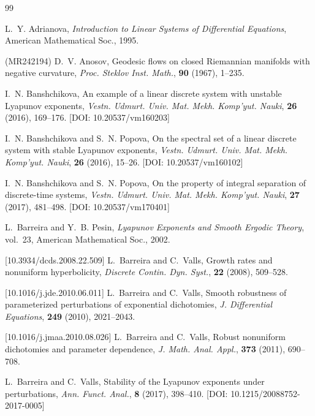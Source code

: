 \documentclass[11pt]{article}
\begin{document}
\begin{thebibliography}{99}

\newblock L.~Y. Adrianova,
\newblock \emph{Introduction to Linear Systems of Differential Equations},
\newblock American Mathematical Soc., 1995.

 (MR242194)
\newblock D.~V. Anosov,
\newblock Geodesic flows on closed {Riemannian} manifolds with negative
  curvature,
\newblock \emph{Proc. Steklov Inst. Math.}, \textbf{90} (1967), 1--235.
\fi

\newblock I.~N. Banshchikova,
\newblock An example of a linear discrete system with unstable {Lyapunov}
  exponents,
\newblock \emph{Vestn. Udmurt. Univ. Mat. Mekh. Komp'yut. Nauki}, \textbf{26}
  (2016), 169--176. [DOI: 10.20537/vm160203]

\newblock I.~N. Banshchikova and S.~N. Popova,
\newblock On the spectral set of a linear discrete system with stable Lyapunov
  exponents,
\newblock \emph{Vestn. Udmurt. Univ. Mat. Mekh. Komp'yut. Nauki}, \textbf{26}
  (2016), 15--26. [DOI: 10.20537/vm160102]

\newblock I.~N. Banshchikova and S.~N. Popova,
\newblock On the property of integral separation of discrete-time systems,
\newblock \emph{Vestn. Udmurt. Univ. Mat. Mekh. Komp'yut. Nauki}, \textbf{27}
  (2017), 481--498. [DOI: 10.20537/vm170401]

\newblock L.~Barreira and Y.~B. Pesin,
\newblock \emph{Lyapunov Exponents and Smooth Ergodic Theory}, vol.~23,
\newblock American Mathematical Soc., 2002.

 [10.3934/dcds.2008.22.509]
\newblock L.~Barreira and C.~Valls,
\newblock Growth rates and nonuniform hyperbolicity,
\newblock \emph{Discrete Contin. Dyn. Syst.}, \textbf{22} (2008), 509--528.
\fi

 [10.1016/j.jde.2010.06.011]
\newblock L.~Barreira and C.~Valls,
\newblock Smooth robustness of parameterized perturbations of exponential
  dichotomies,
\newblock \emph{J. Differential Equations}, \textbf{249} (2010), 2021--2043.
\fi

 [10.1016/j.jmaa.2010.08.026]
\newblock L.~Barreira and C.~Valls,
\newblock Robust nonuniform dichotomies and parameter dependence,
\newblock \emph{J. Math. Anal. Appl.}, \textbf{373} (2011), 690--708.
\fi

\newblock L.~Barreira and C.~Valls,
\newblock Stability of the {Lyapunov} exponents under perturbations,
\newblock \emph{Ann. Funct. Anal.}, \textbf{8} (2017), 398--410. [DOI: 10.1215/20088752-2017-0005]


\end{thebibliography}
\end{document}
